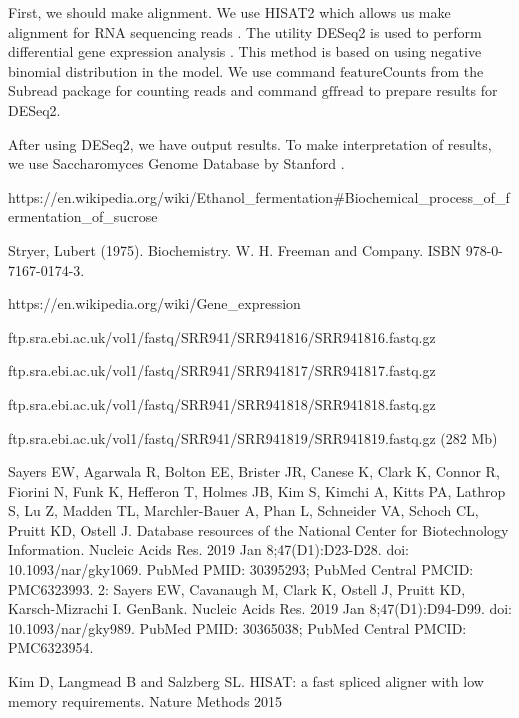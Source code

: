 \documentclass{article}
\begin{document}
 First, we should make alignment. We use HISAT2 which allows us make  alignment  for RNA sequencing reads \cite{hisat}. The utility DESeq2 is used to perform differential gene expression analysis \cite{deseq}. This method is based on using negative binomial distribution in the model. We use command $\textrm{featureCounts}$ from the Subread package \cite{featurecounts} for counting reads and command $\textrm{gffread}$ \cite{gff} to prepare results for DESeq2. 
 
 After using DESeq2, we have output results. To make interpretation of results, we use Saccharomyces Genome Database  by Stanford \cite{ontology}. 
 
 
\begin{thebibliography}{9}
	 https://en.wikipedia.org/wiki/Ethanol_fermentation#Biochemical_process_of_fermentation_of_sucrose



	Stryer, Lubert (1975). Biochemistry. W. H. Freeman and Company. ISBN 978-0-7167-0174-3.
	
		https://en.wikipedia.org/wiki/Gene_expression
	
	

ftp.sra.ebi.ac.uk/vol1/fastq/SRR941/SRR941816/SRR941816.fastq.gz 

ftp.sra.ebi.ac.uk/vol1/fastq/SRR941/SRR941817/SRR941817.fastq.gz 

 ftp.sra.ebi.ac.uk/vol1/fastq/SRR941/SRR941818/SRR941818.fastq.gz 
 
 ftp.sra.ebi.ac.uk/vol1/fastq/SRR941/SRR941819/SRR941819.fastq.gz (282 Mb)

 Sayers EW, Agarwala R, Bolton EE, Brister JR, Canese K, Clark K, Connor R, Fiorini N, Funk K, Hefferon T, Holmes JB, Kim S, Kimchi A, Kitts PA, Lathrop S, Lu Z, Madden TL, Marchler-Bauer A, Phan L, Schneider VA, Schoch CL, Pruitt KD, Ostell J. Database resources of the National Center for Biotechnology Information. Nucleic Acids Res. 2019 Jan 8;47(D1):D23-D28. doi: 10.1093/nar/gky1069. PubMed PMID: 30395293; PubMed Central PMCID: PMC6323993. 2: Sayers EW, Cavanaugh M, Clark K, Ostell J, Pruitt KD, Karsch-Mizrachi I. GenBank. Nucleic Acids Res. 2019 Jan 8;47(D1):D94-D99. doi: 10.1093/nar/gky989. PubMed PMID: 30365038; PubMed Central PMCID: PMC6323954.
 
 
 
Kim D, Langmead B and Salzberg SL. HISAT: a fast spliced aligner with low memory requirements. Nature Methods 2015


\end{thebibliography}
\end{document}
